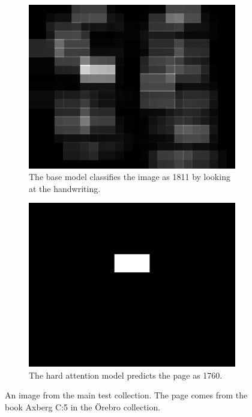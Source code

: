 \begin{figure}
    \begin{subfigure}[t]{0.45\textwidth}
        \centering
        \includegraphics[scale=1.0]{resources/SWE_attention/SoftAtt/att_S3HY-DRC3-H5L.jpg}
        \caption{The base model classifies the image as 1811 by looking at the handwriting.}
    \end{subfigure} \quad %
    \begin{subfigure}[t]{0.45\textwidth}
        \centering    \includegraphics[scale=1.0]{resources/SWE_attention/HardAtt/att_S3HY-DRC3-H5L.jpg}
        \caption{The hard attention model predicts the page as 1760.}
    \end{subfigure}
    
    \caption{An image from the main test collection. The page comes from the book Axberg C:5 in the Örebro collection.}
    \label{fig:attention_dep_H5L}
\end{figure}

